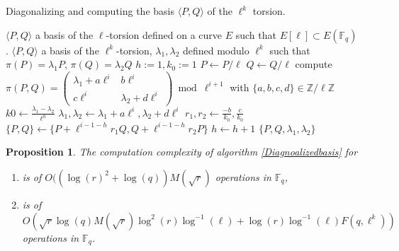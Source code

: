 \documentclass{article}
\theoremstyle{plain}
\newtheorem{prop}[thm]{Proposition}
\theoremstyle{definition}
\theoremstyle{remark}
\begin{document}
\begin{algorithm}
\caption{\label{Diagnoalizedbasis}Diagonalizing and computing the basis $\langle P,Q \rangle $ of the $\ell^k$ torsion.}
\begin{algorithmic}[5]
\REQUIRE $\langle P,Q \rangle$ a basis of the $\ell$-torsion defined on a curve $E$ such that $E[\ell] \subset E(\mathbb{F}_q)$ .
\ENSURE $\langle P,Q \rangle$ a basis of the $\ell^k$-torsion, $\lambda_1, \lambda_2$ defined modulo $\ell^k$ such that $\pi(P)=\lambda_1P$, $ \pi(Q)=\lambda_2Q$
\STATE $h:=1, k_0:=1$
\STATE $P \leftarrow P/\ell$
\STATE $Q \leftarrow Q/\ell$ 
\STATE compute $\pi(P,Q)=\left( \begin{array}{cc}
\lambda_1 + a\ell^{i} & b\ell^{i}\\
c\ell^{i} & \lambda_2 + d\ell^{i}
\end{array} \right) \bmod \ell^{i+1}$ with $\{a,b,c,d\} \in \mathbb{Z}/\ell\mathbb{Z}$
\STATE $k0 \leftarrow \frac{\lambda_1-\lambda_2}{\ell^h}$
\ENDIF
\STATE $\lambda_1, \lambda_2  \gets \lambda_1 + a\ell^i, \lambda_2 + d\ell^i$
\STATE $r_1,r_2 \gets \frac{-b }{k_0}, \frac{c }{k_0}$  
\STATE $\{P,Q\} \gets \{P+\ell^{i-1-h}r_1Q,Q+\ell^{i-1-h}r_2P\}$
\STATE $h \leftarrow h+1$
\ENDIF
\ENDFOR
\RETURN $\{P,Q,\lambda_1,\lambda_2\}$
\end{algorithmic}
\end{algorithm}

\begin{prop}
The computation complexity of algorithm \ref{Diagnoalizedbasis} for 
\begin{enumerate}
\item[$\ell=2$] is of $O((\log(r)^2+\log(q)) M(\sqrt{r}) $ operations in $\mathbb{F}_q$, 
\item[$\ell \neq 2$] is of $O(\sqrt{r} \log(q) M(\sqrt{r})\log^2(r)\log^{-1}(\ell)+ \log(r)\log^{-1}(\ell) F(q,\ell^k))$ operations in $\mathbb{F}_q$.
\end{enumerate}
\end{prop}
\end{document}
